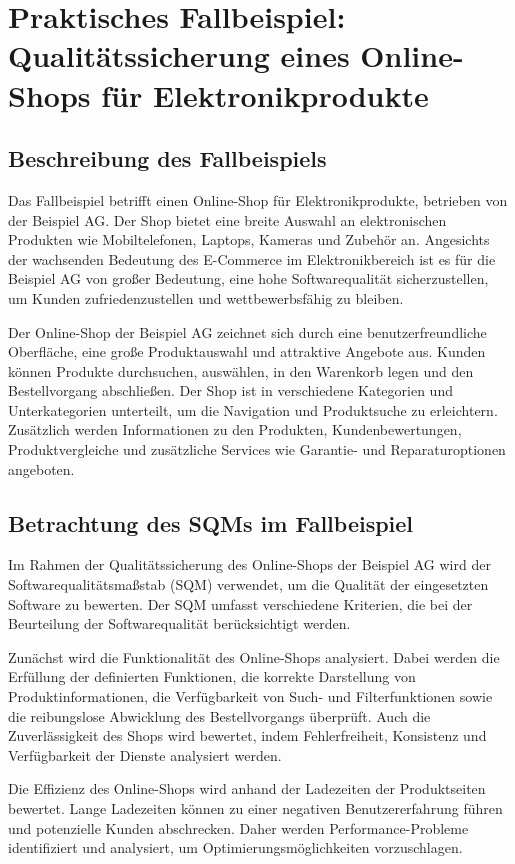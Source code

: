 \section{Praktisches Fallbeispiel: Qualitätssicherung eines Online-Shops für Elektronikprodukte}

\subsection{Beschreibung des Fallbeispiels}
Das Fallbeispiel betrifft einen Online-Shop für Elektronikprodukte, betrieben von der Beispiel AG. Der Shop bietet eine breite Auswahl an elektronischen Produkten wie Mobiltelefonen, Laptops, Kameras und Zubehör an. Angesichts der wachsenden Bedeutung des E-Commerce im Elektronikbereich ist es für die Beispiel AG von großer Bedeutung, eine hohe Softwarequalität sicherzustellen, um Kunden zufriedenzustellen und wettbewerbsfähig zu bleiben.

Der Online-Shop der Beispiel AG zeichnet sich durch eine benutzerfreundliche Oberfläche, eine große Produktauswahl und attraktive Angebote aus. Kunden können Produkte durchsuchen, auswählen, in den Warenkorb legen und den Bestellvorgang abschließen. Der Shop ist in verschiedene Kategorien und Unterkategorien unterteilt, um die Navigation und Produktsuche zu erleichtern. Zusätzlich werden Informationen zu den Produkten, Kundenbewertungen, Produktvergleiche und zusätzliche Services wie Garantie- und Reparaturoptionen angeboten.

\subsection{Betrachtung des SQMs im Fallbeispiel}
Im Rahmen der Qualitätssicherung des Online-Shops der Beispiel AG wird der Softwarequalitätsmaßstab (SQM) verwendet, um die Qualität der eingesetzten Software zu bewerten. Der SQM umfasst verschiedene Kriterien, die bei der Beurteilung der Softwarequalität berücksichtigt werden.

Zunächst wird die Funktionalität des Online-Shops analysiert. Dabei werden die Erfüllung der definierten Funktionen, die korrekte Darstellung von Produktinformationen, die Verfügbarkeit von Such- und Filterfunktionen sowie die reibungslose Abwicklung des Bestellvorgangs überprüft. Auch die Zuverlässigkeit des Shops wird bewertet, indem Fehlerfreiheit, Konsistenz und Verfügbarkeit der Dienste analysiert werden.

Die Effizienz des Online-Shops wird anhand der Ladezeiten der Produktseiten bewertet. Lange Ladezeiten können zu einer negativen Benutzererfahrung führen und potenzielle Kunden abschrecken. Daher werden Performance-Probleme identifiziert und analysiert, um Optimierungsmöglichkeiten vorzuschlagen.

